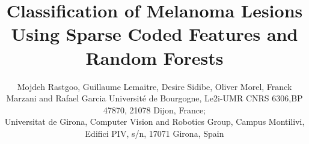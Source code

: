 \title{Classification of Melanoma Lesions Using Sparse Coded Features and Random Forests}
\author{Mojdeh Rastgoo, Guillaume Lemaitre, Desire Sidibe, Oliver Morel, Franck Marzani and Rafael Garcia
\skiplinehalf
{}Universit\'e de Bourgogne, Le2i-UMR CNRS 6306,BP 47870, 21078 Dijon, France;\\
Universitat de Girona, Computer Vision and Robotics Group, Campus Montilivi, Edifici PIV, s/n, 17071 Girona, Spain} 

